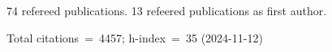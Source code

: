 74 refereed publications. 13 refeered publications as first author.

Total citations~=~4457; h-index~=~35 (2024-11-12)